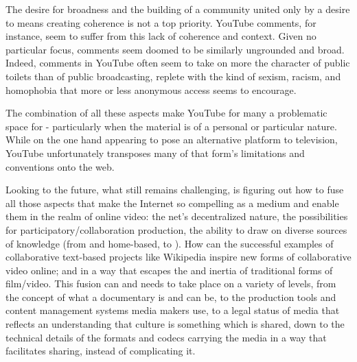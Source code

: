 {The desire for broadness and the building of a
 community united only by
a desire to  means creating coherence is not a top priority.
YouTube comments, for instance, seem to suffer from this lack of
coherence and context. Given no particular focus, comments seem doomed
to be similarly ungrounded and broad. Indeed, comments in YouTube often
seem to take on more the character of public toilets than of public
broadcasting, replete with the kind of sexism, racism, and homophobia
that more or less anonymous  access seems to encourage.


The combination of all these aspects make YouTube for many a problematic
space for  {}- particularly
when the material is of a personal or particular nature. While on the
one hand appearing to pose an alternative platform to television,
YouTube unfortunately transposes many of that form's
limitations and conventions onto the web.

Looking to the future, what still remains challenging, is figuring out
how to fuse all those aspects that make the Internet so compelling as a
medium and enable them in the realm of online video: the
net's decentralized nature, the possibilities for
participatory/collaboration production, the ability to draw on diverse
sources of knowledge (from 
and home{}-based, to ). How
can the successful examples of collaborative text{}-based projects like
Wikipedia inspire new forms of collaborative video online; and in a way
that escapes the  and
inertia of traditional forms of film/video. This fusion can and needs
to take place on a variety of levels, from the concept of what a
documentary is and can be, to the production tools and content
management systems media makers use, to a legal status of media that
reflects an understanding that culture is something which is shared,
down to the technical details of the formats and codecs carrying the
media in a way that facilitates sharing, instead of complicating it.}
